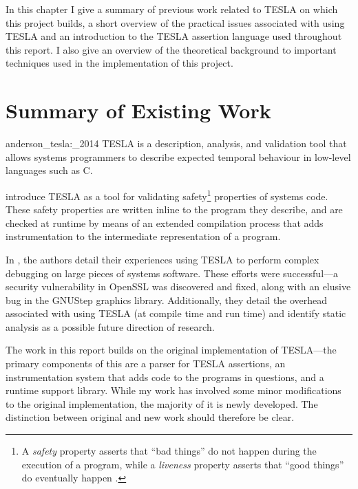 In this chapter I give a summary of previous work related to TESLA on which this
project builds, a short overview of the practical issues associated with using
TESLA and an introduction to the TESLA assertion language used throughout this
report. I also give an overview of the theoretical background to important
techniques used in the implementation of this project.

\section{Summary of Existing Work}

\begin{displaycquote}[p. 1]{anderson_tesla:_2014}
TESLA is a description, analysis, and validation tool that allows systems
  programmers to describe expected temporal behaviour in low-level languages
  such as C.
\end{displaycquote}

\textcite{anderson_tesla:_2014} introduce TESLA as a tool for validating
safety\footnote{A \emph{safety} property asserts that ``bad things'' do not
happen during the execution of a program, while a \emph{liveness} property
asserts that ``good things'' do eventually happen
\cite{lamport_proving_1977,alpern_defining_1984}.} properties of systems code.
These safety properties are written inline to the program they describe, and are
checked at runtime by means of an extended compilation process that adds
instrumentation to the intermediate representation of a program.

In \cite{anderson_tesla:_2014}, the authors detail their experiences
using TESLA to perform complex debugging on large pieces of systems
software. These efforts were successful---a security vulnerability in
OpenSSL was discovered and fixed, along with an elusive bug in the
GNUStep graphics library. Additionally, they detail the overhead
associated with using TESLA (at compile time and run time) and identify
static analysis as a possible future direction of research.

The work in this report builds on the original implementation of
TESLA---the primary components of this are a parser for TESLA
assertions, an instrumentation system that adds code to the programs in
questions, and a runtime support library. While my work has involved
some minor modifications to the original implementation, the majority of
it is newly developed. The distinction between original and new work
should therefore be clear.

